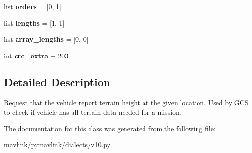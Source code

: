 \begin{DoxyCompactItemize}
\item 
\mbox{\label{classpymavlink_1_1dialects_1_1v10_1_1MAVLink__terrain__check__message_a11553a53df09d0f92c48c63092b7b0e6}} 
list {\bfseries orders} = \mbox{[}0, 1\mbox{]}
\item 
\mbox{\label{classpymavlink_1_1dialects_1_1v10_1_1MAVLink__terrain__check__message_ad213cdadbab2520095a9d3a652f1abda}} 
list {\bfseries lengths} = \mbox{[}1, 1\mbox{]}
\item 
\mbox{\label{classpymavlink_1_1dialects_1_1v10_1_1MAVLink__terrain__check__message_af6caf4ed21ad6789e9048545345c7b91}} 
list {\bfseries array\+\_\+lengths} = \mbox{[}0, 0\mbox{]}
\item 
\mbox{\label{classpymavlink_1_1dialects_1_1v10_1_1MAVLink__terrain__check__message_afbc098ae046e5bb662295163cb072932}} 
int {\bfseries crc\+\_\+extra} = 203
\end{DoxyCompactItemize}


\subsection{Detailed Description}
\begin{DoxyVerb}Request that the vehicle report terrain height at the given
location. Used by GCS to check if vehicle has all terrain data
needed for a mission.
\end{DoxyVerb}
 

The documentation for this class was generated from the following file\+:\begin{DoxyCompactItemize}
\item 
mavlink/pymavlink/dialects/v10.\+py\end{DoxyCompactItemize}
